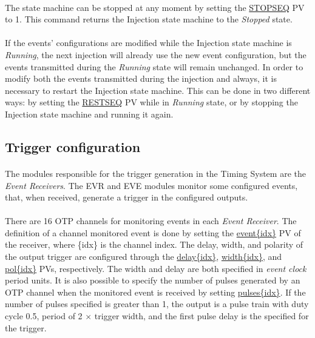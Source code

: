 \documentclass[openany]{article}
\begin{document}
		\paragraph{} The state machine can be stopped at any moment by setting the \hyperref[pvgroup:evg-event]{STOPSEQ} PV to 1. This command returns the Injection state machine to the \emph{Stopped} state.
		\paragraph{} If the events' configurations are modified while the Injection state machine is \emph{Running}, the next injection will already use the new event configuration, but the events transmitted during the \emph{Running} state will remain unchanged. In order to modify both the events transmitted during the injection and always, it is necessary to restart the Injection state machine. This can be done in two different ways: by setting the \hyperref[pvgroup:evg-event]{RESTSEQ} PV while in \emph{Running} state, or by stopping the Injection state machine and running it again.

	\subsection{Trigger configuration}
		\paragraph{} The modules responsible for the trigger generation in the Timing System are the \emph{Event 
Receivers}. The EVR and EVE modules monitor some configured events, that, when received, generate a trigger in the configured outputs.
		\paragraph{} There are 16 OTP channels for monitoring events in each \emph{Event Receiver}. The definition of a channel monitored event is done by setting the \hyperref[pvgroup:evre-otp]{event\{idx\}} PV of the receiver, where \{idx\} is the channel index. The delay, width, and polarity of the output trigger are configured through the \hyperref[pvgroup:evre-otp]{delay\{idx\}}, \hyperref[pvgroup:evre-otp]{width\{idx\}}, and \hyperref[pvgroup:evre-otp]{pol\{idx\}} PVs, respectively. The width and delay are both specified in \emph{event clock} period units. It is also possible to specify the number of pulses generated by an OTP channel when the monitored event is received by setting \hyperref[pvgroup:evre-otp]{pulses\{idx\}}. If the number of pulses specified is greater than 1, the output is a pulse train with duty cycle 0.5, period of 2 $\times$ trigger width, and the first pulse delay is the specified for the trigger.
\end{document}
